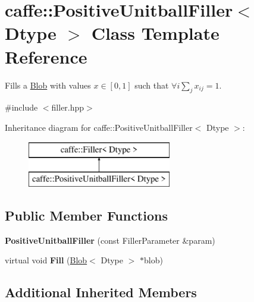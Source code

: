 \hypertarget{classcaffe_1_1PositiveUnitballFiller}{}\section{caffe\+:\+:Positive\+Unitball\+Filler$<$ Dtype $>$ Class Template Reference}
\label{classcaffe_1_1PositiveUnitballFiller}


Fills a \hyperlink{classcaffe_1_1Blob}{Blob} with values $ x \in [0, 1] $ such that $ \forall i \sum_j x_{ij} = 1 $.  




{\ttfamily \#include $<$filler.\+hpp$>$}

Inheritance diagram for caffe\+:\+:Positive\+Unitball\+Filler$<$ Dtype $>$\+:\begin{figure}[H]
\begin{center}
\leavevmode
\includegraphics[height=2.000000cm]{classcaffe_1_1PositiveUnitballFiller}
\end{center}
\end{figure}
\subsection*{Public Member Functions}
\begin{DoxyCompactItemize}
\item 
{\bfseries Positive\+Unitball\+Filler} (const Filler\+Parameter \&param)\hypertarget{classcaffe_1_1PositiveUnitballFiller_acbd0bc19718baa6e2557528e6cf16151}{}\label{classcaffe_1_1PositiveUnitballFiller_acbd0bc19718baa6e2557528e6cf16151}

\item 
virtual void {\bfseries Fill} (\hyperlink{classcaffe_1_1Blob}{Blob}$<$ Dtype $>$ $\ast$blob)\hypertarget{classcaffe_1_1PositiveUnitballFiller_a8ace4f586a5aa3eab7de1dd796556f42}{}\label{classcaffe_1_1PositiveUnitballFiller_a8ace4f586a5aa3eab7de1dd796556f42}

\end{DoxyCompactItemize}
\subsection*{Additional Inherited Members}


